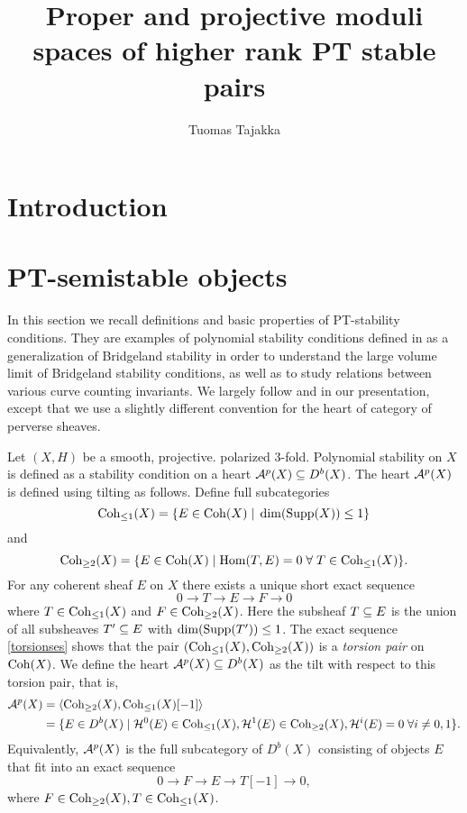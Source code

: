 \documentclass[letterpaper,12pt]{amsart}
\title{Proper and projective moduli spaces of higher rank PT stable pairs}
\author{Tuomas Tajakka}
\date{}
\theoremstyle{remark}
\begin{document}
\maketitle

\section{Introduction}

\section{PT-semistable objects}
In this section we recall definitions and basic properties of PT-stability conditions. They are examples of polynomial stability conditions defined in \cite{bayer-polynomial} as a generalization of Bridgeland stability in order to understand the large volume limit of Bridgeland stability conditions, as well as to study relations between various curve counting invariants. We largely follow \cite{lo-PT1} and \cite{lo-PT2} in our presentation, except that we use a slightly different convention for the heart of category of perverse sheaves.

Let $(X, H)$ be a smooth, projective. polarized 3-fold. Polynomial stability on $X$ is defined as a stability condition on a heart $\mathcal{A}^p(X) \subseteq D^b(X)$. The heart $\mathcal{A}^p(X)$ is defined using tilting as follows. Define full subcategories
\[ \mathrm{Coh}_{\le 1}(X) = \{ E \in \mathrm{Coh}(X) \;|\; \dim(\operatorname{\mathrm{Supp}}(X)) \le 1 \} \]
and
\[ \mathrm{Coh}_{\ge 2}(X) = \{ E \in \mathrm{Coh}(X) \;|\; \mathrm{Hom}(T,E) = 0 \; \forall \; T \in \mathrm{Coh}_{\le 1}(X) \}. \]
For any coherent sheaf $E$ on $X$ there exists a unique short exact sequence
\begin{equation}\label{torsionses}
    0 \to T \to E \to F \to 0
\end{equation} 
where $T \in \mathrm{Coh}_{\le 1}(X)$ and $F \in \mathrm{Coh}_{\ge 2}(X)$. Here the subsheaf $T \subseteq E$ is the union of all subsheaves $T' \subseteq E$ with $\dim(\operatorname{\mathrm{Supp}}(T')) \le 1$. The exact sequence \eqref{torsionses} shows that the pair $(\mathrm{Coh}_{\le 1}(X), \mathrm{Coh}_{\ge 2}(X))$ is a \emph{torsion pair} on $\mathrm{Coh}(X)$. We define the heart $\mathcal{A}^p(X) \subseteq D^b(X)$ as the tilt with respect to this torsion pair, that is,
\begin{align}\label{perverseheart}
    \mathcal{A}^p(X) & = \langle \mathrm{Coh}_{\ge 2}(X), \mathrm{Coh}_{\le 1}(X)[-1] \rangle \\
             & = \{ E \in D^b(X) \;|\; \mathcal{H}^0(E) \in \mathrm{Coh}_{\le 1}(X), \mathcal{H}^1(E) \in \mathrm{Coh}_{\ge 2}(X), \mathcal{H}^i(E) = 0 \;\forall i \neq 0,1 \}. \nonumber
\end{align}
Equivalently, $\mathcal{A}^p(X)$ is the full subcategory of $D^b(X)$ consisting of objects $E$ that fit into an exact sequence
\[ 0 \to F \to E \to T[-1] \to 0, \]
where $F \in \mathrm{Coh}_{\ge 2}(X), T \in \mathrm{Coh}_{\le 1}(X)$.
\end{document}

